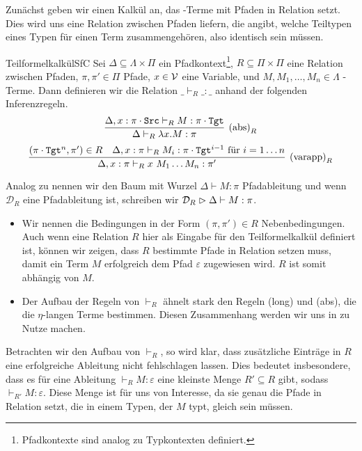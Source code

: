 Zunächst geben wir einen Kalkül an, das \tlambda-Terme mit Pfaden in Relation setzt. Dies wird uns eine Relation zwischen Pfaden liefern, die angibt, welche Teiltypen eines Typen für einen Term zusammengehören, also identisch sein müssen.

\begin{definition}{Teilformelkalkül}{SfC}
    Sei $\Delta\subseteq \Lambda\times\Pi$ ein Pfadkontext\footnote{Pfadkontexte sind analog zu Typkontexten definiert.}, $R\subseteq \Pi\times\Pi$ eine Relation zwischen Pfaden, $\pi,\pi'\in\Pi$ Pfade, $x\in\mathcal{V}$ eine Variable, und $M,M_1,\ldots,M_n\in\Lambda$ \tlambda-Terme. Dann definieren wir die Relation $\_\vdash_R\_ : \_$ anhand der folgenden Inferenzregeln.
    \[\infer[\text{(abs)}_R]{\Delta\vdash_R \lambda x.M : \pi}{\Delta, x:\pi\cdot\src\vdash_R M : \pi\cdot\tgt}\]
    \[\infer[\text{(varapp)}_R]{\Delta,x:\pi\vdash_R x~M_1\ldots M_n : \pi'}{(\pi\cdot\tgt^n,\pi')\in R &
        \Delta, x:\pi\vdash_R M_i : \pi\cdot\tgt^{i-1} \text{ für }i=1\ldots n}\]  
        
    Analog zu  nennen wir den Baum mit Wurzel $\Delta\vdash M : \pi$ Pfadableitung und wenn $\mathcal{D}_R$ eine Pfadableitung ist, schreiben wir $\mathcal{D}_R\vartriangleright\Delta\vdash M : \pi$.
\end{definition}
\begin{remark}
    \begin{itemize}
        \item  Wir nennen die Bedingungen in der Form $(\pi,\pi')\in R$ Nebenbedingungen. Auch wenn eine Relation $R$ hier als Eingabe für den Teilformelkalkül definiert ist, können wir zeigen, dass $R$ bestimmte Pfade in Relation setzen muss, damit ein Term $M$ erfolgreich dem Pfad $\varepsilon$ zugewiesen wird. $R$ ist somit abhängig von $M$.
        \item Der Aufbau der Regeln von $\vdash_R$ ähnelt stark den Regeln (long) und (abs), die die $\eta$-langen Terme bestimmen. Diesen Zusammenhang werden wir uns in  zu Nutze machen.
    \end{itemize}
\end{remark}

Betrachten wir den Aufbau von $\vdash_R$, so wird klar, dass zusätzliche Einträge in $R$ eine erfolgreiche Ableitung nicht fehlschlagen lassen. Dies bedeutet insbesondere, dass es für eine Ableitung $\vdash_R M : \varepsilon$ eine kleinste Menge $R'\subseteq R$ gibt, sodass $\vdash_{R'} M : \varepsilon$. Diese Menge ist für uns von Interesse, da sie genau die Pfade in Relation setzt, die in einem Typen, der $M$ typt, gleich sein müssen.

